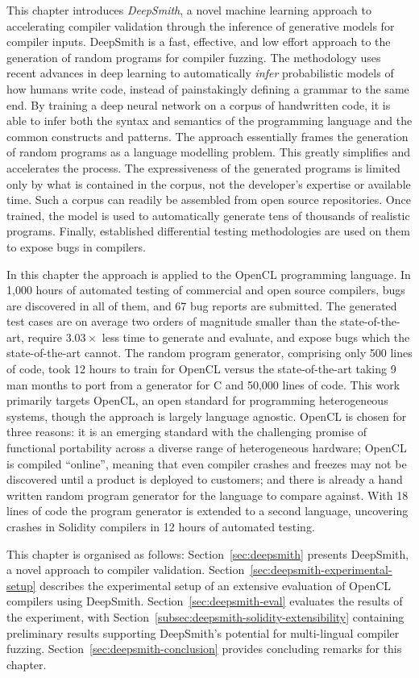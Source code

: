 This chapter introduces \emph{DeepSmith}, a novel machine learning approach to accelerating compiler validation through the inference of generative models for compiler inputs. DeepSmith is a fast, effective, and low effort approach to the generation of random programs for compiler fuzzing. The methodology uses recent advances in deep learning to automatically \emph{infer} probabilistic models of how humans write code, instead of painstakingly defining a grammar to the same end. By training a deep neural network on a corpus of handwritten code, it is able to infer both the syntax and semantics of the programming language and the common constructs and patterns. The approach essentially frames the generation of random programs as a language modelling problem. This greatly simplifies and accelerates the process. The expressiveness of the generated programs is limited only by what is contained in the corpus, not the developer's expertise or available time. Such a corpus can readily be assembled from open source repositories. Once trained, the model is used to automatically generate tens of thousands of realistic programs. Finally, established differential testing methodologies are used on them to expose bugs in compilers.

In this chapter the approach is applied to the OpenCL programming language. In 1,000 hours of automated testing of commercial and open source compilers, bugs are discovered in all of them, and 67 bug reports are submitted. The generated test cases are on average two orders of magnitude smaller than the state-of-the-art, require $3.03\times$ less time to generate and evaluate, and expose bugs which the state-of-the-art cannot. The random program generator, comprising only 500 lines of code, took 12 hours to train for OpenCL versus the state-of-the-art taking 9 man months to port from a generator for C and 50,000 lines of code.  This work primarily targets OpenCL, an open standard for programming heterogeneous systems, though the approach is largely language agnostic. OpenCL is chosen for three reasons: it is an emerging standard with the challenging promise of functional portability across a diverse range of heterogeneous hardware; OpenCL is compiled ``online'', meaning that even compiler crashes and freezes may not be discovered until a product is deployed to customers; and there is already a hand written random program generator for the language to compare against. With 18 lines of code the program generator is extended to a second language, uncovering crashes in Solidity compilers in 12 hours of automated testing.

This chapter is organised as follows:  Section~\ref{sec:deepsmith} presents DeepSmith, a novel approach to compiler validation. Section~\ref{sec:deepsmith-experimental-setup} describes the experimental setup of an extensive evaluation of OpenCL compilers using DeepSmith. Section~\ref{sec:deepsmith-eval} evaluates the results of the experiment, with Section~\ref{subsec:deepsmith-solidity-extensibility} containing preliminary results supporting DeepSmith's potential for multi-lingual compiler fuzzing. Section~\ref{sec:deepsmith-conclusion} provides concluding remarks for this chapter.